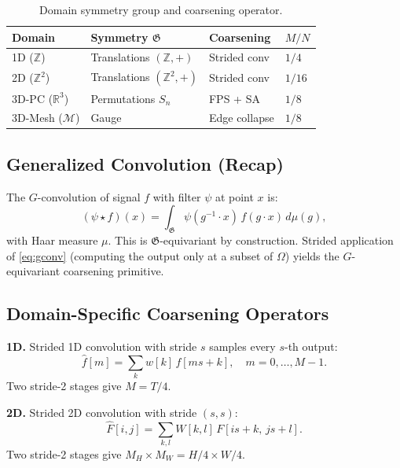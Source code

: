 \documentclass[10pt,conference]{IEEEtran}
\newcommand{\R}{\mathbb{R}}
\newcommand{\Z}{\mathbb{Z}}
\newcommand{\fG}{\mathfrak{G}}
\begin{document}
\begin{table}[t]
  \renewcommand{\arraystretch}{1.2}
  \caption{Domain symmetry group and coarsening operator.}
  \label{tab:symmetry}
  \centering
  \begin{tabular}{llll}
    \toprule
    \textbf{Domain} & \textbf{Symmetry $\fG$} & \textbf{Coarsening} & \textbf{$M/N$} \\
    \midrule
    1D ($\Z$)         & Translations $(\Z,+)$     & Strided conv  & $1/4$ \\
    2D ($\Z^2$)       & Translations $(\Z^2,+)$   & Strided conv  & $1/16$ \\
    3D-PC ($\R^3$)    & Permutations $S_n$        & FPS + SA      & $1/8$  \\
    3D-Mesh ($\mathcal{M}$) & Gauge              & Edge collapse & $1/8$  \\
    \bottomrule
  \end{tabular}
\end{table}

\subsection{Generalized Convolution (Recap)}

The $G$-convolution of signal $f$ with filter $\psi$ at point $x$ is:
\begin{equation}
  (\psi\star f)(x)
    = \int_{\fG}\psi(g^{-1}\!\cdot x)\,f(g\cdot x)\,d\mu(g),
  \label{eq:gconv}
\end{equation}
with Haar measure $\mu$.  This is $\fG$-equivariant by construction.
Strided application of \eqref{eq:gconv} (computing the output only at a
subset of $\Omega$) yields the $G$-equivariant coarsening primitive.

\subsection{Domain-Specific Coarsening Operators}

\noindent\textbf{1D.}  Strided 1D convolution with stride $s$ samples
every $s$-th output:
\begin{equation}
  \hat{f}[m] = \sum_{k} w[k]\,f[ms + k], \quad m=0,\ldots,M{-}1.
  \label{eq:strided1d}
\end{equation}
Two stride-2 stages give $M=T/4$.

\noindent\textbf{2D.}  Strided 2D convolution with stride $(s,s)$:
\begin{equation}
  \hat{F}[i,j] = \sum_{k,l} W[k,l]\,F[is+k,\,js+l].
  \label{eq:strided2d}
\end{equation}
Two stride-2 stages give $M_H \times M_W = H/4 \times W/4$.
\end{document}
